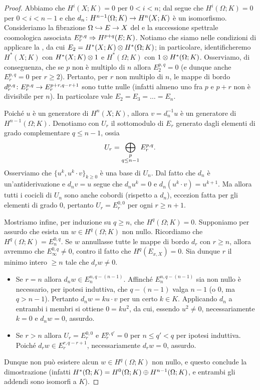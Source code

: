 \begin{proof}
Abbiamo che \(H^i(X;K)=0\) per \(0<i<n\); dal  segue che \(H^i(\Omega;K)=0\) per \(0<i<n-1\) e che \(\map{d_n}{H^{n-1}(\Omega;K)}{H^n(X;K)}\) è un isomorfismo. Consideriamo la fibrazione \(\Omega\hookrightarrow E\to X\) del  e la successione spettrale coomologica associata \(E^{p,q}_r\Rightarrow H^{p+q}(E;K)\). Notiamo che siamo nelle condizioni di applicare la , da cui \(E_2=H^*(X;K)\mathbin{\otimes} H^*(\Omega;K)\); in particolare, identificheremo \(H^*(X;K)\) con \(H^*(X;K)\mathbin{\otimes} 1\) e \(H^*(\Omega;K)\) con \(1\mathbin{\otimes} H^*(\Omega;K)\). Osserviamo, di conseguenza, che se \(p\) non è multiplo di \(n\) allora \(E^{p,q}_2=0\) (e dunque anche \(E^{p,q}_r=0\) per \(r\ge2\)). Pertanto, per \(r\) non multiplo di \(n\), le mappe di bordo \(\map{d^{p,q}_r}{E^{p,q}_r}{E^{p+r,q-r+1}_r}\) sono tutte nulle (infatti almeno uno fra \(p\) e \(p+r\) non è divisibile per \(n\)). In particolare vale \(E_2=E_3=\ldots=E_n\).

Poiché \(u\) è un generatore di \(H^n(X;K)\), allora \(v=d_n^{-1}u\) è un generatore di \(H^{n-1}(\Omega;K)\). Denotiamo con \(U_r\) il sottomodulo di \(E_r\) generato dagli elementi di grado complementare \(q\le n-1\), ossia
\[
U_r=\bigoplus_{\substack{p\\q\le n-1}}E^{p,q}_r.
\]
Osserviamo che \(\{u^k,u^k\cdot v\}_{k\ge 0}\) è una base di \(U_n\). Dal fatto che \(d_n\) è un'antiderivazione e \(d_nv=u\) segue che \(d_n u^k=0\) e \(d_n(u^k\cdot v)=u^{k+1}\). Ma allora tutti i cocicli di \(U_n\) sono anche cobordi (rispetto a \(d_n\)), eccezion fatta per gli elementi di grado \(0\), pertanto \(U_r=E^{0,0}_r\) per ogni \(r\ge n+1\).

Mostriamo infine, per induzione su \(q\ge n\), che \(H^q(\Omega;K)=0\). Supponiamo per assurdo che esista un \(w\in H^q(\Omega;K)\) non nullo. Ricordiamo che \(H^q(\Omega;K)=E^{0,q}_n\). Se \(w\) annullasse tutte le mappe di bordo \(d_r\) con \(r\ge n\), allora avremmo che \(E^{0,q}_\infty\neq 0\), contro il fatto che \(H^q(E_{x,X})=0\). Sia dunque \(r\) il minimo intero \(\ge n\) tale che \(d_rw\neq 0\).
\begin{itemize}
\item Se \(r=n\) allora \(d_nw\in E^{n,q-(n-1)}_n\). Affinché \(E^{n,q-(n-1)}_n\) sia non nullo è necessario, per ipotesi induttiva, che \(q-(n-1)\) valga \(n-1\) (o \(0\), ma \(q>n-1\)). Pertanto \(d_nw=ku\cdot v\) per un certo \(k\in K\). Applicando \(d_n\) a entrambi i membri si ottiene \(0=ku^2\), da cui, essendo \(u^2\neq 0\), necessariamente \(k=0\) e \(d_nw=0\), assurdo.
\item Se \(r>n\) allora \(U_r=E^{0,0}_r\) e \(E^{p,q'}_r=0\) per \(n\le q'<q\) per ipotesi induttiva. Poiché \(d_rw\in E^{r,q-r+1}_r\), necessariamente \(d_rw=0\), assurdo.
\end{itemize}
Dunque non può esistere alcun \(w\in H^q(\Omega;K)\) non nullo, e questo conclude la dimostrazione (infatti \(H^*(\Omega;K)=H^0(\Omega;K)\mathbin{\oplus} H^{n-1}(\Omega;K)\), e entrambi gli addendi sono isomorfi a \(K\)).
\end{proof}

